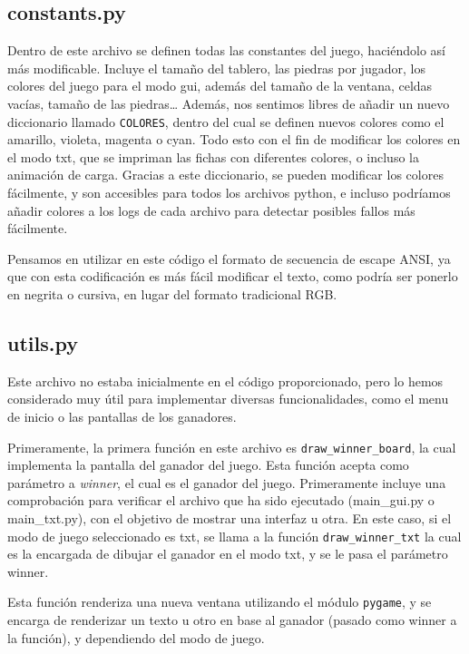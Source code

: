 \documentclass[a4paper,12pt]{article}
\begin{document}
\vspace{\baselineskip}
\subsection{constants.py}
Dentro de este archivo se definen todas las constantes del juego, haciéndolo así más modificable. Incluye el tamaño del tablero, las piedras por jugador,
los colores del juego para el modo gui, además del tamaño de la ventana, celdas vacías, tamaño de las piedras\ldots
Además, nos sentimos libres de añadir un nuevo diccionario llamado \texttt{COLORES}, dentro del cual se definen nuevos colores como el amarillo, violeta,
magenta o cyan. Todo esto con el fin de modificar los colores en el modo txt, que se impriman las fichas con diferentes colores, o incluso la animación de carga.
Gracias a este diccionario, se pueden modificar los colores fácilmente, y son accesibles para todos los archivos python, e incluso podríamos añadir colores
a los logs de cada archivo para detectar posibles fallos más fácilmente.

Pensamos en utilizar en este código el formato de secuencia de escape ANSI, ya que con esta codificación es más fácil modificar el texto, como podría ser ponerlo
en negrita o cursiva, en lugar del formato tradicional RGB. 

\subsection{utils.py}
Este archivo no estaba inicialmente en el código proporcionado, pero lo hemos considerado muy útil para implementar diversas funcionalidades, como el menu de inicio o 
las pantallas de los ganadores.

\vspace{\baselineskip}
Primeramente, la primera función en este archivo es \texttt{draw\_winner\_board}, la cual implementa la pantalla del ganador del juego. Esta función acepta como parámetro 
a \textit{winner}, el cual es el ganador del juego. Primeramente incluye una comprobación para verificar el archivo que ha sido ejecutado (main\_gui.py o main\_txt.py), con el 
objetivo de mostrar una interfaz u otra. En este caso, si el modo de juego seleccionado es txt, se llama a la función \texttt{draw\_winner\_txt} la cual es la encargada de 
dibujar el ganador en el modo txt, y se le pasa el parámetro winner.

\vspace{\baselineskip}
Esta función renderiza una nueva ventana utilizando el módulo \texttt{pygame}, y se encarga de renderizar un texto u otro en base al ganador (pasado como winner a la función), y 
dependiendo del modo de juego.
\end{document}
